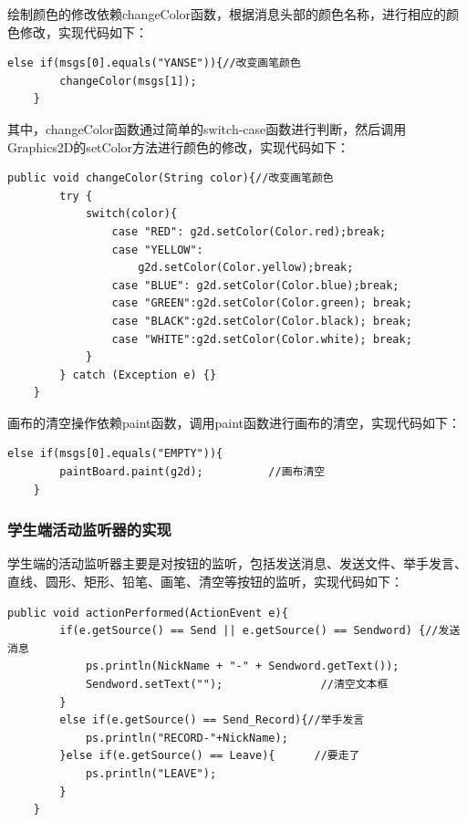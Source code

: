 \documentclass[UTF8,12pt]{article}
\begin{document}
绘制颜色的修改依赖changeColor函数，根据消息头部的颜色名称，进行相应的颜色修改，实现代码如下：

\begin{lstlisting}[title=绘制颜色的修改,frame=shadowbox]
    else if(msgs[0].equals("YANSE")){//改变画笔颜色
        changeColor(msgs[1]);
    }
\end{lstlisting}

其中，changeColor函数通过简单的switch-case函数进行判断，然后调用Graphics2D的setColor方法进行颜色的修改，实现代码如下：

\begin{lstlisting}[title=changeColor函数,frame=shadowbox]
    public void changeColor(String color){//改变画笔颜色
        try {
            switch(color){
                case "RED": g2d.setColor(Color.red);break;
                case "YELLOW":
                    g2d.setColor(Color.yellow);break;
                case "BLUE": g2d.setColor(Color.blue);break;
                case "GREEN":g2d.setColor(Color.green); break;
                case "BLACK":g2d.setColor(Color.black); break;
                case "WHITE":g2d.setColor(Color.white); break;
            }
        } catch (Exception e) {}
    }
\end{lstlisting}

画布的清空操作依赖paint函数，调用paint函数进行画布的清空，实现代码如下：

\begin{lstlisting}[title=画布的清空操作,frame=shadowbox]
    else if(msgs[0].equals("EMPTY")){
        paintBoard.paint(g2d);			//画布清空
    }
\end{lstlisting}

\subsubsection{学生端活动监听器的实现}
学生端的活动监听器主要是对按钮的监听，包括发送消息、发送文件、举手发言、直线、圆形、矩形、铅笔、画笔、清空等按钮的监听，实现代码如下：

\begin{lstlisting}[title=学生端活动监听器的实现,frame=shadowbox]
    public void actionPerformed(ActionEvent e){
        if(e.getSource() == Send || e.getSource() == Sendword) {//发送消息
            ps.println(NickName + "-" + Sendword.getText());
            Sendword.setText("");               //清空文本框
        }
        else if(e.getSource() == Send_Record){//举手发言
            ps.println("RECORD-"+NickName);
        }else if(e.getSource() == Leave){      //要走了
            ps.println("LEAVE");
        }
    }
\end{lstlisting}
\end{document}
